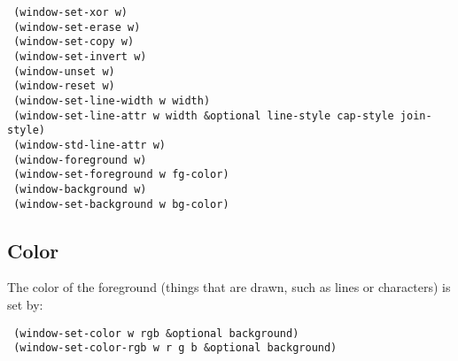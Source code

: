 \vspace{-0.1in}
{\tt \hspace*{0.5in} (window-set-xor w)} \\
{\tt \hspace*{0.5in} (window-set-erase w)} \\
{\tt \hspace*{0.5in} (window-set-copy w)} \\
{\tt \hspace*{0.5in} (window-set-invert w)} \\
{\tt \hspace*{0.5in} (window-unset w)} \\
{\tt \hspace*{0.5in} (window-reset w)} \\

{\tt \hspace*{0.5in} (window-set-line-width w width)} \\
{\tt \hspace*{0.5in} (window-set-line-attr w width \&optional line-style cap-style join-style)} \\
{\tt \hspace*{0.5in} (window-std-line-attr w)} \\

{\tt \hspace*{0.5in} (window-foreground w)} \\
{\tt \hspace*{0.5in} (window-set-foreground w fg-color)} \\
{\tt \hspace*{0.5in} (window-background w)} \\
{\tt \hspace*{0.5in} (window-set-background w bg-color)} \\


\subsection{Color}

The color of the foreground (things that are drawn, such as lines or
characters) is set by:

{\tt \hspace*{0.5in} (window-set-color w rgb \&optional background)} \\
{\tt \hspace*{0.5in} (window-set-color-rgb w r g b \&optional background)} \\

